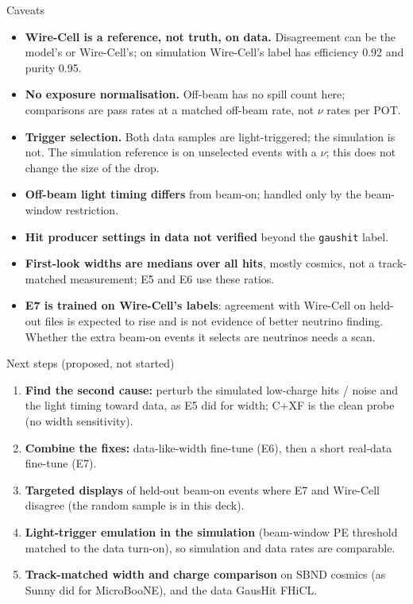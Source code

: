 \documentclass[aspectratio=169,10pt]{beamer}
\newcommand{\code}[1]{\texttt{#1}}
\begin{document}
\begin{frame}{Caveats}
  \footnotesize
  \begin{itemize}\setlength{\itemsep}{5pt}
    \item \textbf{Wire-Cell is a reference, not truth, on data.} Disagreement can be the model's or Wire-Cell's; on simulation
      Wire-Cell's label has efficiency 0.92 and purity 0.95.
    \item \textbf{No exposure normalisation.} Off-beam has no spill count here; comparisons are pass rates at a matched off-beam
      rate, not $\nu$ rates per POT.
    \item \textbf{Trigger selection.} Both data samples are light-triggered; the simulation is not. The simulation reference is on
      unselected events with a $\nu$; this does not change the size of the drop.
    \item \textbf{Off-beam light timing differs} from beam-on; handled only by the beam-window restriction.
    \item \textbf{Hit producer settings in data not verified} beyond the \code{gaushit} label.
    \item \textbf{First-look widths are medians over all hits}, mostly cosmics, not a track-matched measurement; E5 and E6 use these
      ratios.
    \item \textbf{E7 is trained on Wire-Cell's labels}: agreement with Wire-Cell on held-out files is expected to rise and is not
      evidence of better neutrino finding. Whether the extra beam-on events it selects are neutrinos needs a scan.
  \end{itemize}
\end{frame}

\begin{frame}{Next steps (proposed, not started)}
  \footnotesize
  \begin{enumerate}\setlength{\itemsep}{6pt}
    \item \textbf{Find the second cause:} perturb the simulated low-charge hits / noise and the light timing toward data, as E5 did for
      width; C+XF is the clean probe (no width sensitivity).
    \item \textbf{Combine the fixes:} data-like-width fine-tune (E6), then a short real-data fine-tune (E7).
    \item \textbf{Targeted displays} of held-out beam-on events where E7 and Wire-Cell disagree (the random sample is in this deck).
    \item \textbf{Light-trigger emulation in the simulation} (beam-window PE threshold matched to the data turn-on), so simulation
      and data rates are comparable.
    \item \textbf{Track-matched width and charge comparison} on SBND cosmics (as Sunny did for MicroBooNE), and the data GausHit
      FHiCL.
  \end{enumerate}
\end{frame}
\end{document}
